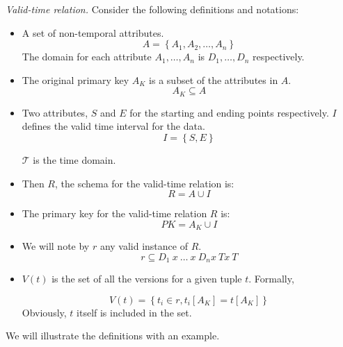 \documentclass{llncs}
\newcommand{\T}{\mathcal{T}}
\begin{document}
\begin{definition}
\label{def:valid-time-relation}
\emph{Valid-time relation.}
Consider the following definitions and notations:

\begin{itemize}
 \item A set of non-temporal attributes.
	\begin{equation}
	\label{eq:attribute-set}
	A = \left \lbrace A_1, A_2, \ldots, A_n \right \rbrace
	\end{equation}
      The domain for each attribute $A_1, \ldots, A_n$ is $D_1, \ldots, D_n$ respectively. 
\item The original primary key $A_K$ is a subset of the attributes in $A$.
      \begin{equation}
       \label{eq:primary-key-a}
      A_K \subseteq A
      \end{equation}
\item Two attributes, $S$  and $E$ for the starting and ending points respectively. $I$ defines the valid time interval for the data. 
\begin{equation}
 \label{eq:attribute-time-interval}
I = \left \lbrace S, E \right \rbrace
\end{equation}

$\T$ is the time domain.

\item Then $R$, the schema for the valid-time relation is:
\begin{equation}
 \label{eq:valid-time-relation}
R = A \cup  I
\end{equation}
\item The primary key for the valid-time relation $R$ is:
\begin{equation}
 \label{eq:valid-time-temporal-pk}
PK = A_K \cup I
\end{equation}


\item We will note by $r$ any valid instance of $R$. 
      \begin{equation}
       \label{eq:valid-time-instance}
      r \subseteq D_1\ x\ \ldots\ x\ D_n x\ T x\ T
      \end{equation}


\item $V(t)$ is the set of all the versions for a given tuple $t$. Formally,

\begin{equation}
 \label{eq:all-the-versions}
V(t) =\left \lbrace t_i \in r, t_i\left[A_K\right] = t\left[A_K\right] \right \rbrace
\end{equation}
Obviously, $t$ itself is included in the set.
\end{itemize}
\end{definition}
We will illustrate the definitions with an example.
\end{document}
